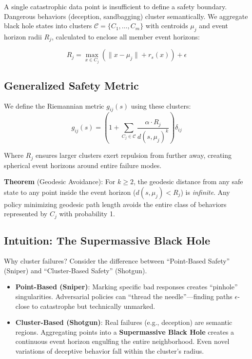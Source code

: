 \documentclass{article}
\begin{document}
A single catastrophic data point is insufficient to define a safety boundary. Dangerous behaviors (deception, sandbagging) cluster semantically. We aggregate black hole states into clusters $\mathcal{C} = \{C_1, \dots, C_m\}$ with centroids $\mu_j$ and event horizon radii $R_j$, calculated to enclose all member event horizons:

\begin{equation}
    R_j = \max_{x \in C_j} \left( \|x - \mu_j\| + r_s(x) \right) + \epsilon
\end{equation}

\subsection{Generalized Safety Metric}

We define the Riemannian metric $g_{ij}(s)$ using these clusters:
\begin{equation}
g_{ij}(s) = \left( 1 + \sum_{C_j \in \mathcal{C}} \frac{\alpha \cdot R_j}{d(s, \mu_j)^k} \right) \delta_{ij}
\end{equation}

Where $R_j$ ensures larger clusters exert repulsion from further away, creating spherical event horizons around entire failure modes.

\textbf{Theorem} (Geodesic Avoidance): For $k \ge 2$, the geodesic distance from any safe state to any point inside the event horizon ($d(s, \mu_j) < R_j$) is \emph{infinite}. Any policy minimizing geodesic path length avoids the entire class of behaviors represented by $C_j$ with probability 1.

\subsection{Intuition: The Supermassive Black Hole}

Why cluster failures? Consider the difference between ``Point-Based Safety'' (Sniper) and ``Cluster-Based Safety'' (Shotgun).

\begin{itemize}[leftmargin=*]
    \item \textbf{Point-Based (Sniper)}: Marking specific bad responses creates ``pinhole'' singularities. Adversarial policies can ``thread the needle''---finding paths $\epsilon$-close to catastrophe but technically unmarked.
    \item \textbf{Cluster-Based (Shotgun)}: Real failures (e.g., deception) are semantic regions. Aggregating points into a \textbf{Supermassive Black Hole} creates a continuous event horizon engulfing the entire neighborhood. Even novel variations of deceptive behavior fall within the cluster's radius.
\end{itemize}
\end{document}
